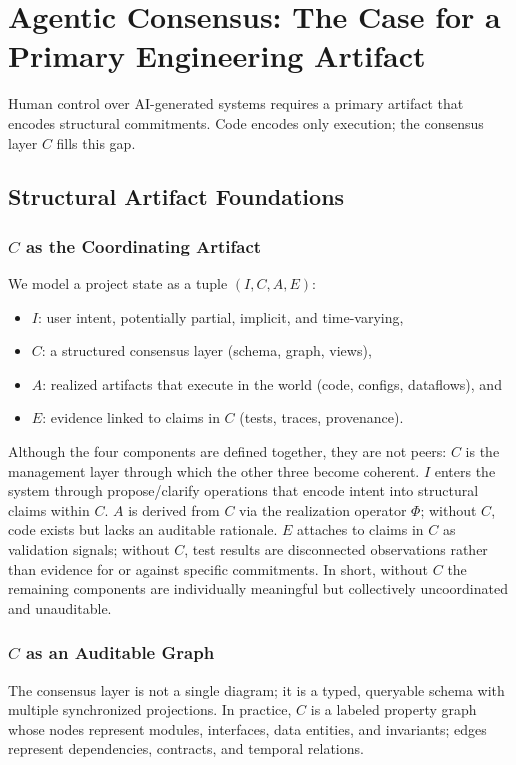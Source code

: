 
\section{Agentic Consensus: The Case for a Primary Engineering Artifact}

Human control over AI-generated systems requires a primary artifact that encodes structural commitments. Code encodes only execution; the consensus layer $C$ fills this gap.

\subsection{Structural Artifact Foundations}

\subsubsection{$C$ as the Coordinating Artifact}
We model a project state as a tuple $(I, C, A, E)$:
\begin{itemize}[leftmargin=*, itemsep=2pt]
  \item $I$: user intent, potentially partial, implicit, and time-varying,
  \item $C$: a structured consensus layer (schema, graph, views),
  \item $A$: realized artifacts that execute in the world (code, configs, dataflows), and
  \item $E$: evidence linked to claims in $C$ (tests, traces, provenance).
\end{itemize}
Although the four components are defined together, they are not peers: $C$ is the management layer through which the other three become coherent.
$I$ enters the system through propose/clarify operations that encode intent into structural claims within $C$.
$A$ is derived from $C$ via the realization operator $\Phi$; without $C$, code exists but lacks an auditable rationale.
$E$ attaches to claims in $C$ as validation signals; without $C$, test results are disconnected observations rather than evidence for or against specific commitments.
In short, without $C$ the remaining components are individually meaningful but collectively uncoordinated and unauditable.

\subsubsection{$C$ as an Auditable Graph}
The consensus layer is not a single diagram; it is a typed, queryable schema with multiple synchronized projections.
In practice, $C$ is a labeled property graph whose nodes represent modules, interfaces, data entities, and invariants; edges represent dependencies, contracts, and temporal relations.


